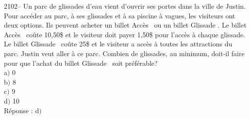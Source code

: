 \documentclass[letterpaper, 12pt]{article}
\begin{document}
2102-- Un parc de glissades d'eau vient d'ouvrir ses portes dans la ville de Justin. Pour acc\'eder au parc, \`a ses glissades et \`a sa piscine \`a vagues, les visiteurs ont deux options. Ils peuvent acheter un billet \og Acc\`es \fg\, ou un billet \og Glissade \fg. Le billet \og Acc\`es \fg\, co\^ute 10,50\$ et le visiteur doit payer 1,50\$ pour l'acc\`es \`a chaque glissade. Le billet \og Glissade \fg\, co\^ute 25\$ et le visiteur a acc\`es \`a toutes les attractions du parc. Justin veut aller \`a ce parc. Combien de glissades, au minimum, doit-il faire pour que l'achat du billet \og Glissade \fg\, soit pr\'ef\'erable?\\

a$)$ 0\\
b$)$ 8\\
c$)$ 9\\
d$)$ 10\\

R\'eponse : d$)$\\
\end{document}
